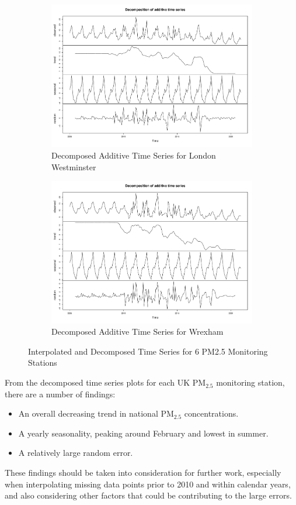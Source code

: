 \begin{figure}
\begin{subfigure}{.5\textwidth}
        \includegraphics[width=\linewidth]{Images/London Westminster ts.pdf}
        \caption{Decomposed Additive Time Series for London Westminster}
        \label{fig:LWts}
    \end{subfigure}%
    \begin{subfigure}{.5\textwidth}
        \centering
        \includegraphics[width=\linewidth]{Images/Wrexham ts.pdf}
        \caption{Decomposed Additive Time Series for Wrexham}
        \label{fig:Wts}
    \end{subfigure}
\caption{Interpolated and Decomposed Time Series for 6 PM2.5 Monitoring Stations}
\label{fig:decompts}
\end{figure}

From the decomposed time series plots for each UK PM$_{2.5}$ monitoring station, there are a number of findings:
\begin{itemize}
    \item An overall decreasing trend in national PM$_{2.5}$ concentrations.
    \item A yearly seasonality, peaking around February and lowest in summer.
    \item A relatively large random error.
\end{itemize}
These findings should be taken into consideration for further work, especially when interpolating missing data points prior to 2010 and within calendar years, and also considering other factors that could be contributing to the large errors.